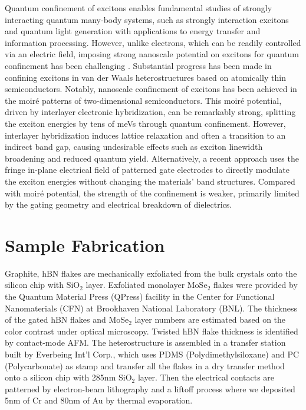 Quantum confinement of excitons enables fundamental studies of strongly interacting quantum many-body systems, such as strongly interaction excitons and quantum light generation \cite{Aharonovich2016-sl,Palacios-Berraquero2017-zr,Baek2020-qm,Hu2024-ua,Heithoff2024-jn,Shanks2021-qb,Thureja2022-cv} with applications to energy transfer and information processing\cite{Montblanch2023-ny,Butov2017-ls}. 
However, unlike electrons, which can be readily controlled via an electric field\cite{Wang2018-tm}, imposing strong nanoscale potential on excitons for quantum confinement has been challenging \cite{Butov2017-ls,Rapaport2005-fy}. Substantial progress has been made in confining excitons in van der Waals heterostructures based on atomically thin semiconductors\cite{Hu2024-ua,Heithoff2024-jn,Thureja2022-cv,Thureja2024-og}. 
Notably, nanoscale confinement of excitons has been achieved in the moiré patterns of two-dimensional semiconductors\cite{Jin2019-ce,Tran2019-uv,Wu2018-ty,Yu2017-so,Naik2022-qk,Seyler2019-ok}. This moiré potential, driven by interlayer electronic hybridization, can be remarkably strong, splitting the exciton energies by tens of meVs through quantum confinement\cite{Seyler2019-ok,Shabani2021-lf}. 
However, interlayer hybridization induces lattice relaxation and often a transition to an indirect band gap, causing undesirable effects such as exciton linewidth broadening and reduced quantum yield\cite{Tang2021-io,Huang2022-jh,Li2021-xh}. Alternatively, a recent approach uses the fringe in-plane electrical field of patterned gate electrodes to directly modulate the exciton energies without changing the materials’ band structures\cite{Heithoff2024-jn,Thureja2022-cv,Thureja2024-og}. Compared with moiré potential, the strength of the confinement is weaker, primarily limited by the gating geometry and electrical breakdown of dielectrics.


\section{Sample Fabrication}

Graphite, hBN flakes are mechanically exfoliated from the bulk crystals onto the silicon chip with SiO$_2$ layer. 
Exfoliated monolayer MoSe$_2$  flakes were provided by the Quantum Material Press (QPress) facility in the Center for Functional Nanomaterials (CFN) at Brookhaven National Laboratory (BNL). 
The thickness of the gated hBN flakes and MoSe$_2$ layer numbers are estimated based on the color contrast under optical microscopy. Twisted hBN flake thickness is identified by contact-mode AFM. 
The heterostructure is assembled in a transfer station built by Everbeing Int’l Corp., which uses PDMS (Polydimethylsiloxane) and PC (Polycarbonate) as stamp and transfer all the flakes in a dry transfer method onto a silicon chip with 285nm SiO$_2$ layer. 
Then the electrical contacts are patterned by electron-beam lithography and a liftoff process where we deposited 5nm of Cr and 80nm of Au by thermal evaporation.

